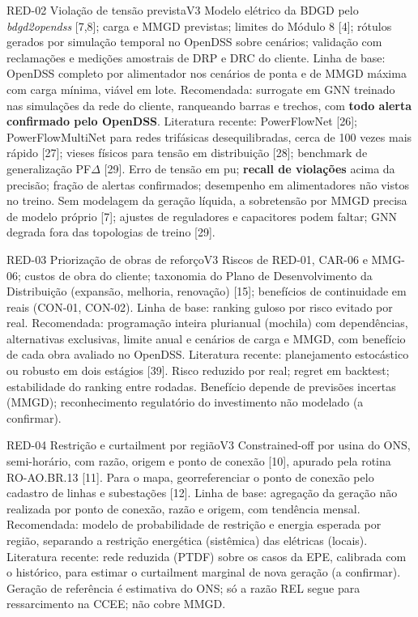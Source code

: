 \begin{ficha}{RED-02 \textperiodcentered{} Violação de tensão prevista}{V3}
 Modelo elétrico da BDGD pelo \emph{bdgd2opendss} [7,8]; carga
e MMGD previstas; limites do Módulo 8 [4]; rótulos gerados por simulação
temporal no OpenDSS sobre cenários; validação com reclamações e medições
amostrais de DRP e DRC do cliente.
 Linha de base: OpenDSS completo por alimentador nos
cenários de ponta e de MMGD máxima com carga mínima, viável em lote.
Recomendada: surrogate em GNN treinado nas simulações da rede do cliente,
ranqueando barras e trechos, com \textbf{todo alerta confirmado pelo OpenDSS}.
Literatura recente: PowerFlowNet [26]; PowerFlowMultiNet para redes trifásicas
desequilibradas, cerca de 100 vezes mais rápido [27]; vieses físicos para
tensão em distribuição [28]; benchmark de generalização PF$\Delta$ [29].
 Erro de tensão em pu; \textbf{recall de violações} acima da
precisão; fração de alertas confirmados; desempenho em alimentadores não
vistos no treino.
 Sem modelagem da geração líquida, a sobretensão por MMGD
precisa de modelo próprio [7]; ajustes de reguladores e capacitores podem
faltar; GNN degrada fora das topologias de treino [29].
\end{ficha}

\begin{ficha}{RED-03 \textperiodcentered{} Priorização de obras de reforço}{V3}
 Riscos de RED-01, CAR-06 e MMG-06; custos de obra do cliente;
taxonomia do Plano de Desenvolvimento da Distribuição (expansão, melhoria,
renovação) [15]; benefícios de continuidade em reais (CON-01, CON-02).
 Linha de base: ranking guloso por risco evitado por real.
Recomendada: programação inteira plurianual (mochila) com dependências,
alternativas exclusivas, limite anual e cenários de carga e MMGD, com
benefício de cada obra avaliado no OpenDSS. Literatura recente: planejamento
estocástico ou robusto em dois estágios [39].
 Risco reduzido por real; regret em backtest; estabilidade do
ranking entre rodadas.
 Benefício depende de previsões incertas (MMGD);
reconhecimento regulatório do investimento não modelado (a confirmar).
\end{ficha}

\begin{ficha}{RED-04 \textperiodcentered{} Restrição e curtailment por região}{V3}
 Constrained-off por usina do ONS, semi-horário, com razão,
origem e ponto de conexão [10], apurado pela rotina RO-AO.BR.13 [11]. Para o
mapa, georreferenciar o ponto de conexão pelo cadastro de linhas e
subestações [12].
 Linha de base: agregação da geração não realizada por
ponto de conexão, razão e origem, com tendência mensal. Recomendada: modelo
de probabilidade de restrição e energia esperada por região, separando a
restrição energética (sistêmica) das elétricas (locais). Literatura recente:
rede reduzida (PTDF) sobre os casos da EPE, calibrada com o histórico, para
estimar o curtailment marginal de nova geração (a confirmar).
 Geração de referência é estimativa do ONS; só a razão REL
segue para ressarcimento na CCEE; não cobre MMGD.
\end{ficha}

